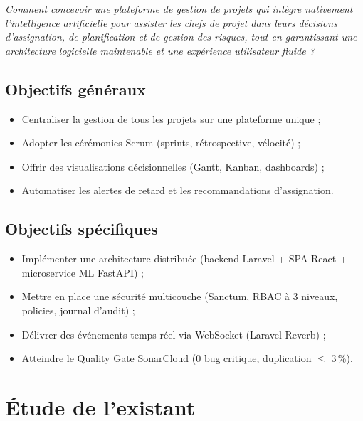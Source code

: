 \begin{mdframed}[linecolor=primary,linewidth=1.5pt]
\centering
\textit{Comment concevoir une plateforme de gestion de projets qui intègre
nativement l'intelligence artificielle pour assister les chefs de projet dans
leurs décisions d'assignation, de planification et de gestion des risques,
tout en garantissant une architecture logicielle maintenable et une expérience
utilisateur fluide ?}
\end{mdframed}

\subsection{Objectifs généraux}

\begin{itemize}
  \item Centraliser la gestion de tous les projets sur une plateforme unique ;
  \item Adopter les cérémonies Scrum (sprints, rétrospective, vélocité) ;
  \item Offrir des visualisations décisionnelles (Gantt, Kanban, dashboards) ;
  \item Automatiser les alertes de retard et les recommandations d'assignation.
\end{itemize}

\subsection{Objectifs spécifiques}

\begin{itemize}
  \item Implémenter une architecture distribuée (backend Laravel + SPA React
        + microservice ML FastAPI) ;
  \item Mettre en place une sécurité multicouche (Sanctum, RBAC à 3 niveaux,
        policies, journal d'audit) ;
  \item Délivrer des événements temps réel via WebSocket (Laravel Reverb) ;
  \item Atteindre le Quality Gate SonarCloud (0 bug critique, duplication
        $\leq$ 3\,\%).
\end{itemize}

\section{Étude de l'existant}

